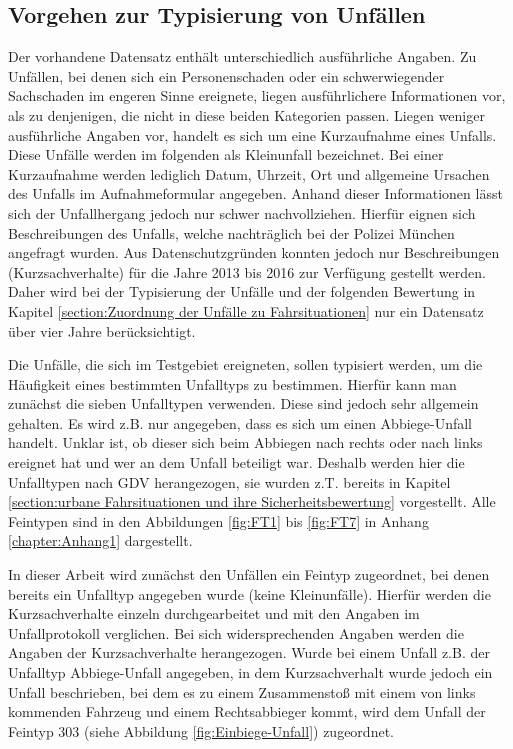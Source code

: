 \subsection{Vorgehen zur Typisierung von Unfällen}\label{subsection:Vorgehen zur Typisierung}
Der vorhandene Datensatz enthält unterschiedlich ausführliche Angaben. Zu Unfällen, bei denen sich ein Personenschaden oder ein schwerwiegender Sachschaden im engeren Sinne ereignete, liegen ausführlichere Informationen vor, als zu denjenigen, die nicht in diese beiden Kategorien passen. Liegen weniger ausführliche Angaben vor, handelt es sich um eine Kurzaufnahme eines Unfalls. Diese Unfälle werden im folgenden als Kleinunfall bezeichnet. Bei einer Kurzaufnahme werden lediglich Datum, Uhrzeit, Ort und allgemeine Ursachen des Unfalls im Aufnahmeformular angegeben. Anhand dieser Informationen lässt sich der Unfallhergang jedoch nur schwer nachvollziehen. Hierfür eignen sich Beschreibungen des Unfalls, welche nachträglich bei der Polizei München angefragt wurden. Aus Datenschutzgründen konnten jedoch nur Beschreibungen (Kurzsachverhalte) für die Jahre 2013 bis 2016 zur Verfügung gestellt werden. Daher wird bei der Typisierung der Unfälle und der folgenden Bewertung in Kapitel \ref{section:Zuordnung der Unfälle zu Fahrsituationen} nur ein Datensatz über vier Jahre berücksichtigt.

Die Unfälle, die sich im Testgebiet ereigneten, sollen typisiert werden, um die Häufigkeit eines bestimmten Unfalltyps zu bestimmen. Hierfür kann man zunächst die sieben Unfalltypen verwenden. Diese sind jedoch sehr allgemein gehalten. Es wird z.B. nur angegeben, dass es sich um einen Abbiege-Unfall handelt. Unklar ist, ob dieser sich beim Abbiegen nach rechts oder nach links ereignet hat und wer an dem Unfall beteiligt war. Deshalb werden hier die Unfalltypen nach GDV herangezogen, sie wurden z.T. bereits in Kapitel \ref{section:urbane Fahrsituationen und ihre Sicherheitsbewertung} vorgestellt. Alle Feintypen sind in den Abbildungen \ref{fig:FT1} bis \ref{fig:FT7} in Anhang \ref{chapter:Anhang1} dargestellt.

In dieser Arbeit wird zunächst den Unfällen ein Feintyp zugeordnet, bei denen bereits ein Unfalltyp angegeben wurde (keine Kleinunfälle). Hierfür werden die Kurzsachverhalte einzeln durchgearbeitet und mit den Angaben im Unfallprotokoll verglichen. Bei sich widersprechenden Angaben werden die Angaben der Kurzsachverhalte herangezogen. Wurde bei einem Unfall z.B. der Unfalltyp Abbiege-Unfall angegeben, in dem Kurzsachverhalt wurde jedoch ein Unfall beschrieben, bei dem es zu einem Zusammenstoß mit einem von links kommenden Fahrzeug und einem Rechtsabbieger kommt, wird dem Unfall der Feintyp 303 (siehe Abbildung \ref{fig:Einbiege-Unfall}) zugeordnet.

